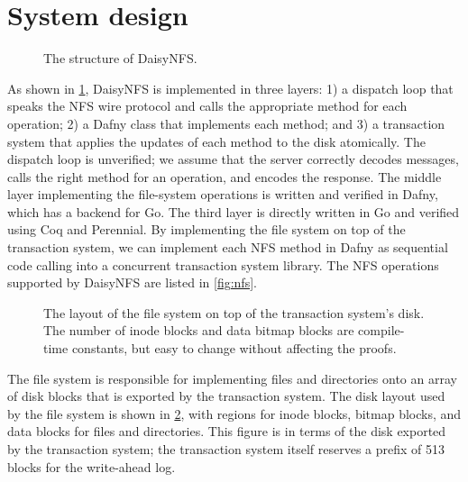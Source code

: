\section{System design}%
\label{sec:daisy:system}

\begin{figure}
  \center
  
  \caption{The structure of DaisyNFS.}
  \label{fig:system}
\end{figure}

As shown in \cref{fig:system}, DaisyNFS is implemented in three layers:
1) a dispatch loop that speaks the NFS wire protocol and calls the
appropriate method for each operation; 2) a Dafny class that
implements each method; and 3) a transaction system that applies the
updates of each method to the disk atomically.  The dispatch loop is
unverified; we assume that the server correctly decodes messages,
calls the right method for an operation, and encodes the response. The
middle layer implementing the file-system operations is written
and verified in Dafny, which has a backend for Go.  The
third layer is directly written in Go and verified using Coq and
Perennial.  By implementing the file system on top of the transaction
system, we can implement each NFS method in Dafny as sequential code
calling into a concurrent transaction system library. The NFS
operations supported by DaisyNFS are listed in \cref{fig:nfs}.


\begin{figure}
  \centering
  
  \caption[File-system disk layout]{The layout of the file system on top of the transaction system's
    disk. The number of inode blocks and data bitmap blocks are compile-time
    constants, but easy to change without affecting the proofs.}
  \label{fig:layout}
\end{figure}

The file system is responsible for implementing files and directories
onto an array of disk blocks that is exported by the transaction
system.  The disk layout used by the file system is shown in
\cref{fig:layout}, with regions for inode blocks, bitmap blocks,
and data blocks for files and directories. This figure is in terms of
the disk exported by the transaction system; the transaction system
itself reserves a prefix of 513 blocks for the write-ahead log.

